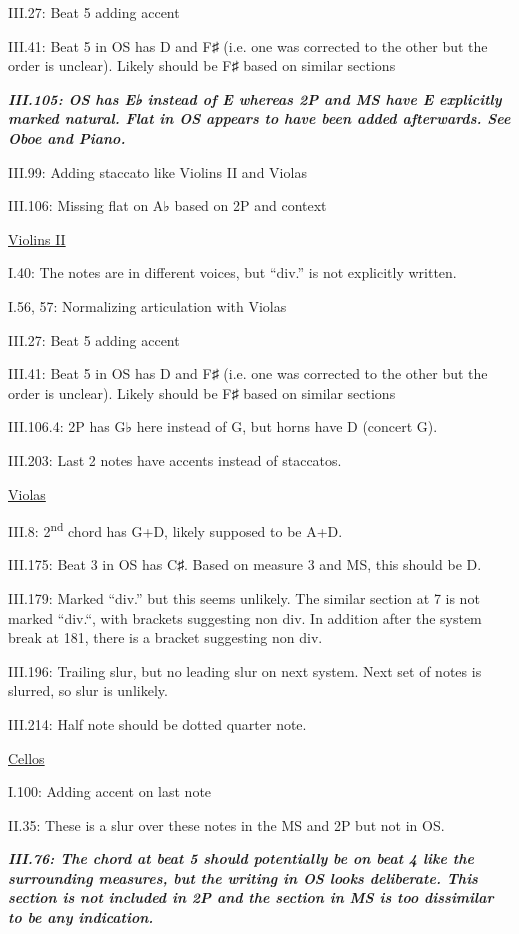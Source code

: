 \documentclass[twoside]{article}
\begin{document}
\begin{hangparas}{15pt}{1}
\begin{multicols}{2}
III.27: Beat 5 adding accent

III.41: Beat 5 in OS has D and F♯ (i.e. one was corrected to the other but the order is unclear). Likely should be F♯ based on similar sections

\textbf{\textit{III.105: OS has E♭ instead of E whereas 2P and MS have E explicitly marked natural. Flat in OS appears to have been added afterwards. See Oboe and Piano.}}

III.99: Adding staccato like Violins II and Violas

III.106: Missing flat on A♭ based on 2P and context

\underline{Violins II}

I.40: The notes are in different voices, but ``div.'' is not explicitly written.

I.56, 57: Normalizing articulation with Violas

III.27: Beat 5 adding accent

III.41: Beat 5 in OS has D and F♯ (i.e. one was corrected to the other but the order is unclear). Likely should be F♯ based on similar sections

III.106.4: 2P has G♭ here instead of G, but horns have D (concert G).

III.203: Last 2 notes have accents instead of staccatos.

\underline{Violas}

III.8: 2\textsuperscript{nd} chord has G+D, likely supposed to be A+D.

III.175: Beat 3 in OS has C♯. Based on measure 3 and MS, this should be D.

III.179: Marked ``div.'' but this seems unlikely. The similar section at 7 is not marked ``div.``, with brackets suggesting non div. In addition after the system break at 181, there is a bracket suggesting non div.

III.196: Trailing slur, but no leading slur on next system. Next set of notes is slurred, so slur is unlikely.

III.214: Half note should be dotted quarter note.

\underline{Cellos}

I.100: Adding accent on last note

II.35: These is a slur over these notes in the MS and 2P but not in OS.

\textbf{\textit{III.76: The chord at beat 5 should potentially be on beat 4 like the surrounding measures, but the writing in OS looks deliberate. This section is not included in 2P and the section in MS is too dissimilar to be any indication.}}


\end{multicols}
\end{hangparas}
\end{document}

